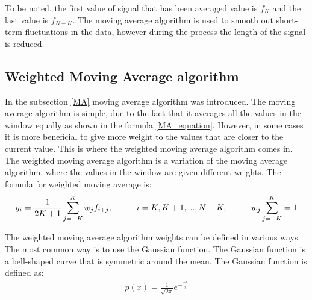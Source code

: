 \documentclass[a4paper,12pt,fleqn]{article}
\begin{document}
    To be noted, the first value of signal that has been averaged value is \begin{math}
        f_K
    \end{math} and the last value is \begin{math}
        f_{N-K}
        \end{math}. The moving average algorithm is used to smooth out short-term fluctuations in the data, 
        however during the process the length of the signal is reduced.
        \subsection{Weighted Moving Average algorithm}\label{WMA}
        \hspace{1em} In the subsection \ref{MA} moving average algorithm was introduced. The moving average 
        algorithm is simple, due to the fact that it averages all the values in the window equally as shown 
        in the formula \ref{MA_equation}. However, in some cases it is more beneficial to give more weight to
        the values that are closer to the current value. This is where the weighted moving average algorithm
        comes in. The weighted moving average algorithm is a variation of the moving average algorithm, where
        the values in the window are given different weights. The formula for weighted moving average is:
        \begin{gather}\label{WMA_equation}
            g_i = \frac{1}{2K+1} \sum_{j=-K}^{K} w_j f_{i+j},\hspace{1 cm}i = K, K+1, ..., N-K, \hspace{1 cm} w_j \sum_{j=-K}^K = 1
        \end{gather}


        The weighted moving average algorithm weights can be defined in various ways. The most common way is to
        use the Gaussian function. The Gaussian function is a bell-shaped curve that is symmetric around the mean.
        The Gaussian function is defined as:
        \newpage
        \begin{gather}\label{Gaussian}
            p(x) = \frac{1}{\sqrt{2\pi}}e^{-\frac{x^2}{2}}
        \end{gather}
\end{document}
